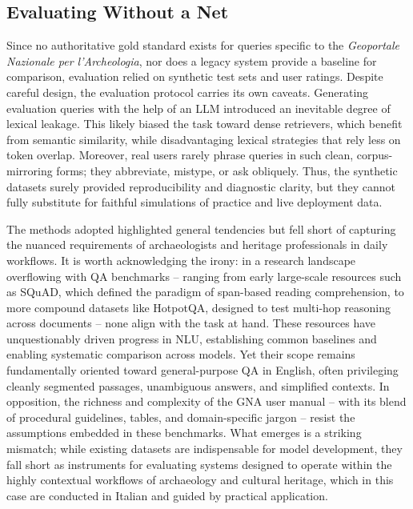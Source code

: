 \begin{spacing}{1.5}
\section{Evaluating Without a Net}
Since no authoritative gold standard exists for queries specific to the \textit{Geoportale Nazionale per l'Archeologia}, nor does a legacy system provide a baseline for comparison, evaluation relied on synthetic test sets and user ratings. Despite careful design, the evaluation protocol carries its own caveats. Generating evaluation queries with the help of an LLM introduced an inevitable degree of lexical leakage. This likely biased the task toward dense retrievers, which benefit from semantic similarity, while disadvantaging lexical strategies that rely less on token overlap. Moreover, real users rarely phrase queries in such clean, corpus-mirroring forms; they abbreviate, mistype, or ask obliquely. Thus, the synthetic datasets surely provided reproducibility and diagnostic clarity, but they cannot fully substitute for faithful simulations of practice and live deployment data.

The methods adopted highlighted general tendencies but fell short of capturing the nuanced requirements of archaeologists and heritage professionals in daily workflows. It is worth acknowledging the irony: in a research landscape overflowing with QA benchmarks -- ranging from early large-scale resources such as SQuAD, which defined the paradigm of span-based reading comprehension, to more compound datasets like HotpotQA, designed to test multi-hop reasoning across documents -- none align with the task at hand. These resources have unquestionably driven progress in NLU, establishing common baselines and enabling systematic comparison across models. Yet their scope remains fundamentally oriented toward general-purpose QA in English, often privileging cleanly segmented passages, unambiguous answers, and simplified contexts. In opposition, the richness and complexity of the GNA user manual -- with its blend of procedural guidelines, tables, and domain-specific jargon -- resist the assumptions embedded in these benchmarks. What emerges is a striking mismatch; while existing datasets are indispensable for model development, they fall short as instruments for evaluating systems designed to operate within the highly contextual workflows of archaeology and cultural heritage, which in this case are conducted in Italian and guided by practical application.



\end{spacing}

